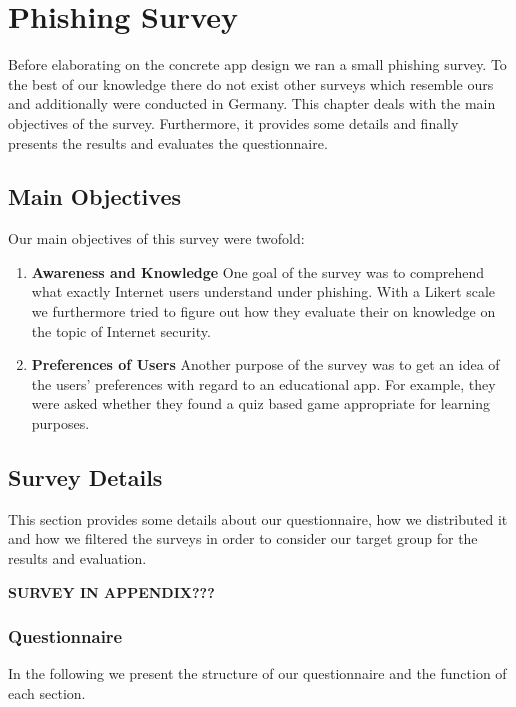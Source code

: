 \section{Phishing Survey}
\label{s:prestudy}
Before elaborating on the concrete app design we ran a small phishing survey.
 To the best of our knowledge there do not exist other surveys which resemble ours and additionally were conducted in Germany.
 This chapter deals with the main objectives of the survey.
 Furthermore, it provides some details and finally presents the results and evaluates the questionnaire.


\subsection{Main Objectives}
Our main objectives of this survey were twofold:

\begin{enumerate}
	\item \textbf{Awareness and Knowledge} One goal of the survey was to comprehend what exactly Internet users understand under phishing.
 With a Likert scale we furthermore tried to figure out how they evaluate their on knowledge on the topic of Internet security.

	\item \textbf{Preferences of Users} Another purpose of the survey was to get an idea of the users' preferences with regard to an educational app.
 For example, they were asked whether they found a quiz based game appropriate for learning purposes.

\end{enumerate}
\subsection{Survey Details}
This section provides some details about our questionnaire, how we distributed it and how we filtered the surveys in order to consider our target group for the results and evaluation.

\textbf{SURVEY IN APPENDIX???}

\subsubsection{Questionnaire}
In the following we present the structure of our questionnaire and the function of each section.
 
